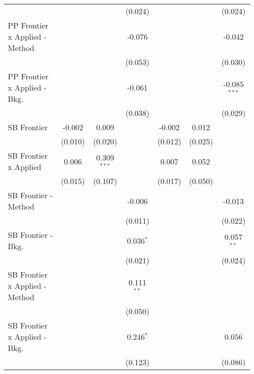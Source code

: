 \begin{tabular}{lcccccc}
                                  &              &               & (0.024)       &         &              & (0.024)\\   
   PP Frontier x Applied - Method &              &               & -0.076        &         &              & -0.042\\   
                                  &              &               & (0.053)       &         &              & (0.030)\\   
   PP Frontier x Applied - Bkg.   &              &               & -0.061        &         &              & -0.085$^{***}$\\   
                                  &              &               & (0.038)       &         &              & (0.029)\\   
   SB Frontier                    & -0.002       & 0.009         &               & -0.002  & 0.012        &   \\   
                                  & (0.010)      & (0.020)       &               & (0.012) & (0.025)      &   \\   
   SB Frontier x Applied          & 0.006        & 0.309$^{***}$ &               & 0.007   & 0.052        &   \\   
                                  & (0.015)      & (0.107)       &               & (0.017) & (0.050)      &   \\   
   SB Frontier - Method           &              &               & -0.006        &         &              & -0.013\\   
                                  &              &               & (0.011)       &         &              & (0.022)\\   
   SB Frontier - Bkg.             &              &               & 0.036$^{*}$   &         &              & 0.057$^{**}$\\   
                                  &              &               & (0.021)       &         &              & (0.024)\\   
   SB Frontier x Applied - Method &              &               & 0.111$^{**}$  &         &              &   \\   
                                  &              &               & (0.050)       &         &              &   \\   
   SB Frontier x Applied - Bkg.   &              &               & 0.246$^{*}$   &         &              & 0.056\\   
                                  &              &               & (0.123)       &         &              & (0.086)\\   

\end{tabular}
